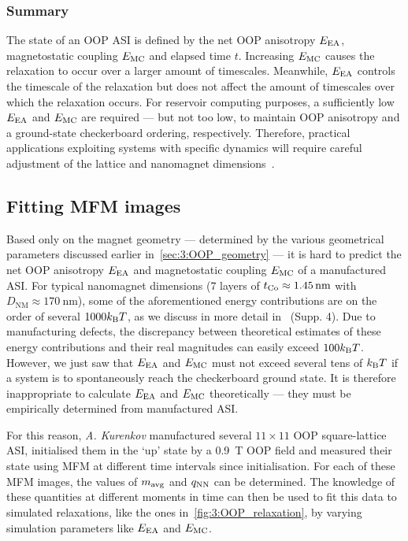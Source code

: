 \subsubsection{Summary}
The state of an OOP ASI is defined by the net OOP anisotropy $E_\mathrm{EA}$, magnetostatic coupling $E_\mathrm{MC}$ and elapsed time $t$.
Increasing $E_\mathrm{MC}$ causes the relaxation to occur over a larger amount of timescales.
Meanwhile, $E_\mathrm{EA}$ controls the timescale of the relaxation but does not affect the amount of timescales over which the relaxation occurs.
For reservoir computing purposes, a sufficiently low $E_\mathrm{EA}$ and $E_\mathrm{MC}$ are required --- but not too low, to maintain OOP anisotropy and a ground-state checkerboard ordering, respectively.
Therefore, practical applications exploiting systems with specific dynamics will require careful adjustment of the lattice and nanomagnet dimensions~\cite{KUR-24}.

\subsection{Fitting MFM images}\label{sec:3:MFM}
Based only on the magnet geometry --- determined by the various geometrical parameters discussed earlier in~\cref{sec:3:OOP_geometry} --- it is hard to predict the net OOP anisotropy $E_\mathrm{EA}$ and magnetostatic coupling $E_\mathrm{MC}$ of a manufactured ASI.
For typical nanomagnet dimensions (7 layers of $t_{\ce{Co}} \approx \SI{1.45}{\nano\metre}$ with $D_\mathrm{NM} \approx \SI{170}{\nano\metre}$), some of the aforementioned energy contributions are on the order of several $1000 \kBT$, as we discuss in more detail in~ (Supp. 4). %
Due to manufacturing defects, the discrepancy between theoretical estimates of these energy contributions and their real magnitudes can easily exceed $100 \kBT$. %
However, we just saw that $E_\mathrm{EA}$ and $E_\mathrm{MC}$ must not exceed several tens of $\kBT$ if a system is to spontaneously reach the checkerboard ground state.
It is therefore inappropriate to calculate $E_\mathrm{EA}$ and $E_\mathrm{MC}$ theoretically --- they must be empirically determined from manufactured ASI. \\\par
For this reason, \textit{A. Kurenkov} manufactured several $11 \times 11$ OOP square-lattice ASI, initialised them in the `up' state by a \SI{0.9}{\tesla} OOP field and measured their state using MFM at different time intervals since initialisation.
For each of these MFM images, the values of $m_\mathrm{avg}$ and $q_\mathrm{NN}$ can be determined.
The knowledge of these quantities at different moments in time can then be used to fit this data to simulated relaxations, like the ones in~\cref{fig:3:OOP_relaxation}, by varying simulation parameters like $E_\mathrm{EA}$ and $E_\mathrm{MC}$.

